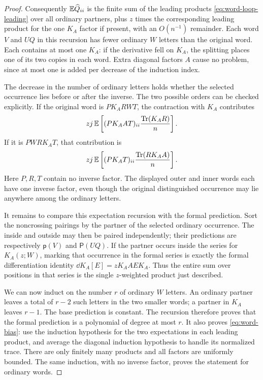 \begin{proof}
Consequently $\mathbb E\widehat Q_{ii}$ is the finite sum of the leading
products \eqref{eq:word-loop-leading} over all ordinary partners,
plus $z$ times the corresponding leading product for the one
$K_A$ factor if present, with an $O(n^{-1})$ remainder.  Each word
$V$ and $UQ$ in this recursion has fewer ordinary $W$ letters than
the original word.  Each contains at most one $K_A$: if the
derivative fell on $K_A$, the splitting places one of its two
copies in each word.  Extra diagonal factors $A$ cause no problem,
since at most one is added per decrease of the induction index.

The decrease in the number of ordinary letters holds whether the
selected occurrence lies before or after the inverse.  The two
possible orders can be checked explicitly.  If the original word is
$P K_A R W T$, the contraction with $K_A$ contributes
\[
 zj\,\mathbb E\left[(P K_A A T)_{ii}\frac{\operatorname{Tr}(K_A R)}n\right].
\]
If it is $P W R K_A T$, that contribution is
\[
 zj\,\mathbb E\left[(P K_A T)_{ii}\frac{\operatorname{Tr}(R K_A A)}n\right].
\]
Here $P,R,T$ contain no inverse factor.  The displayed outer and
inner words each have one inverse factor, even though the original
distinguished occurrence may lie anywhere among the ordinary letters.

It remains to compare this expectation recursion with the formal
prediction.  Sort the noncrossing pairings by the partner of the
selected ordinary occurrence.  The inside and outside may then be paired
independently; their predictions are respectively
$\mathsf p(V)$ and $\mathsf P(UQ)$.  If the partner occurs inside
the series for $K_A(z;W)$, marking that occurrence in the formal
series is exactly the formal differentiation identity
$\dd K_A[E]=zK_AAEK_A$.  Thus the entire sum over positions in that
series is the single $z$-weighted product just described.

We can now induct on the number $r$ of ordinary $W$ letters.
An ordinary partner leaves a total of $r-2$ such letters in the
two smaller words; a partner in $K_A$ leaves $r-1$.  The base
prediction is constant.  The recursion therefore proves that
the formal prediction is a polynomial of degree at most $r$.
It also proves \eqref{eq:word-bias}: use the induction hypothesis
for the two expectations in each leading product, and average
the diagonal induction hypothesis to handle its normalized
trace.  There are only finitely many products and all factors
are uniformly bounded.  The same induction, with no inverse
factor, proves the statement for ordinary words.
\end{proof}

